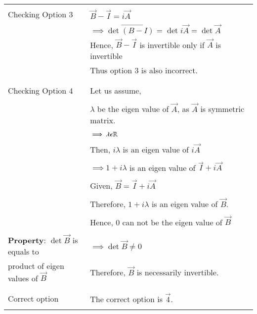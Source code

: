 \documentclass[journal,12pt,twocolumn]{IEEEtran}
\begin{document}
\begin{table}[ht]
\begin{center}
\begin{tabular}{|p{5cm}|p{10cm}|}
\hline
 &\\
Checking Option 3
& $\vec{B}-\vec{I}=i\vec{A}$\\
&$\implies\det\vec{(B-I)}=\det i\vec{A}=\det\vec{A}$\\
& Hence, $\vec{B}-\vec{I}$ is invertible only if $\vec{A}$ is invertible\\& Thus option 3 is also incorrect.\\
&\\
\hline
& \\
Checking Option 4  & Let us assume,\\
&\\ 
& $\lambda$ be the eigen value of $\vec{A}$, as $\vec{A}$ is symmetric matrix.\\
&\\
& $\implies \lambda\epsilon \mathbb{R}$\\
&\\
& Then, $i\lambda$ is an eigen value of $i\vec{A}$\\
&\\
& $\implies 1+i\lambda$ is an eigen value of $\vec{I}+i\vec{A}$ \\
&\\
& Given, $\vec{B}=\vec{I}+i\vec{A}$\\
&\\
& Therefore, $1+i\lambda$ is an eigen value of $\vec{B}$.\\
&\\
& Hence, 0 can not be the eigen value of $\vec{B}$\\
&\\
\textbf{Property}: $\det\vec{B}$ is equals to 
& $\implies \det\vec{B} \neq 0$\\product of eigen values of $\vec{B}$
& Therefore, $\vec{B}$ is necessarily invertible.\\
&\\
\hline
&\\
Correct option  & The correct option is $\vec{4}$.\\
&\\
\hline
    \end{tabular}
    \end{center}
\end{table}
\end{document}
